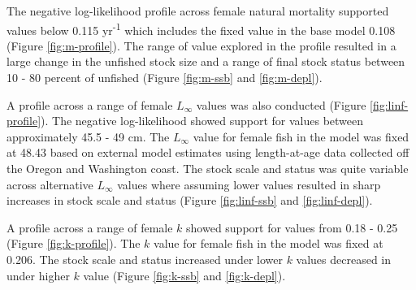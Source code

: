 \documentclass[11pt,
  english,
  a4paper,
]{article}
\begin{document}

The negative log-likelihood profile across female natural mortality supported values below 0.115 yr\textsuperscript{-1} which includes the fixed value in the base model 0.108 (Figure \ref{fig:m-profile}). The range of value explored in the profile resulted in a large change in the unfished stock size and a range of final stock status between 10 - 80 percent of unfished (Figure \ref{fig:m-ssb} and \ref{fig:m-depl}).

\leavevmode\tagmcend\tagstructend\par


A profile across a range of female {\(L_{\infty}\)\leavevmode\tagmcend\tagstructend} values was also conducted (Figure \ref{fig:linf-profile}). The negative log-likelihood showed support for values between approximately 45.5 - 49 cm. The {\(L_{\infty}\)\leavevmode\tagmcend\tagstructend} value for female fish in the model was fixed at 48.43 based on external model estimates using length-at-age data collected off the Oregon and Washington coast. The stock scale and status was quite variable across alternative {\(L_{\infty}\)\leavevmode\tagmcend\tagstructend} values where assuming lower values resulted in sharp increases in stock scale and status (Figure \ref{fig:linf-ssb} and \ref{fig:linf-depl}).

\leavevmode\tagmcend\tagstructend\par


A profile across a range of female {\(k\)\leavevmode\tagmcend\tagstructend} showed support for values from 0.18 - 0.25 (Figure \ref{fig:k-profile}). The {\(k\)\leavevmode\tagmcend\tagstructend} value for female fish in the model was fixed at 0.206. The stock scale and status increased under lower {\(k\)\leavevmode\tagmcend\tagstructend} values decreased in under higher {\(k\)\leavevmode\tagmcend\tagstructend} value (Figure \ref{fig:k-ssb} and \ref{fig:k-depl}).

\leavevmode\tagmcend\tagstructend\par
\end{document}
